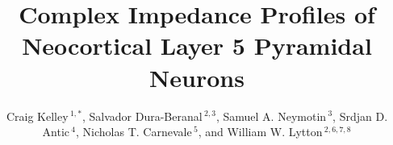 \documentclass[utf8]{frontiersSCNS} %
\def\firstAuthorLast{Kelley {et~al.}} %
\def\Authors{Craig Kelley\,$^{1,*}$, Salvador Dura-Beranal\,$^{2,3}$, Samuel A. Neymotin\,$^{3}$, Srdjan D. Antic\,$^{4}$, Nicholas T. Carnevale\,$^{5}$, and William W. Lytton\,$^{2,6,7,8}$}
\begin{document}
\onecolumn
{}

\title[Impedance Profiles of L5 Pyramidal Neurons]{Complex Impedance Profiles of Neocortical Layer 5 Pyramidal Neurons} 

\author[\firstAuthorLast ]{\Authors} %
\address{} %
\correspondance{} %
\extraAuth{}%
\maketitle
\end{document}
